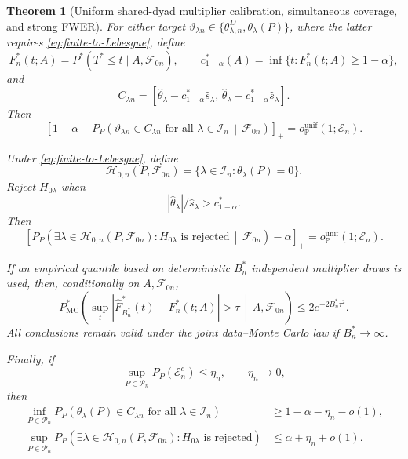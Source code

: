 \documentclass[11pt]{article}
\newtheorem{theorem}{Theorem}[section]
\theoremstyle{definition}
\newcommand{\1}{\mathbf 1}\newcommand{\op}{\operatorname}
\begin{document}
\begin{theorem}[Uniform shared-dyad multiplier calibration,\label{thm:fwer}
simultaneous coverage, and strong FWER]
For either target
$\vartheta_{\lambda n}\in\{\theta_{\lambda,n}^D,\theta_\lambda(P)\}$,
where the latter requires \eqref{eq:finite-to-Lebesgue}, define
\[
F_n^*(t;A)
=
P^*(T^*\le t\mid A,\mathcal F_{0n}),
\qquad
c_{1-\alpha}^*(A)
=
\inf\{t:F_n^*(t;A)\ge1-\alpha\},
\]
and
\[
C_{\lambda n}
=
\left[
\widehat\theta_\lambda-c_{1-\alpha}^*\widehat s_\lambda,\,
\widehat\theta_\lambda+c_{1-\alpha}^*\widehat s_\lambda
\right].
\]
Then
\begin{equation}
\left[
1-\alpha
-
P_P\!\left(
\vartheta_{\lambda n}\in C_{\lambda n}
\text{ for all }\lambda\in\mathcal I_n
\,\middle|\,
\mathcal F_{0n}
\right)
\right]_+
=
o_{\mathbb P}^{\mathrm{unif}}(1;\mathcal E_n).
\label{eq:conditional-coverage}
\end{equation}

Under \eqref{eq:finite-to-Lebesgue}, define
\[
\mathcal H_{0,n}(P,\mathcal F_{0n})
=
\{\lambda\in\mathcal I_n:\theta_\lambda(P)=0\}.
\]
Reject $H_{0\lambda}$ when
\[
|\widehat\theta_\lambda|/\widehat s_\lambda>c_{1-\alpha}^*.
\]
Then
\begin{equation}
\left[
P_P\!\left(
\exists\lambda\in\mathcal H_{0,n}(P,\mathcal F_{0n}):
H_{0\lambda}\text{ is rejected}
\,\middle|\,
\mathcal F_{0n}
\right)
-\alpha
\right]_+
=
o_{\mathbb P}^{\mathrm{unif}}(1;\mathcal E_n).
\label{eq:conditional-strong-fwer}
\end{equation}

If an empirical quantile based on deterministic $B_n^*$ independent
multiplier draws is used, then, conditionally on $A,\mathcal F_{0n}$,
\begin{equation}
P_{\mathrm{MC}}^*\!\left(
\sup_t|\widehat F_{B_n^*}^*(t)-F_n^*(t;A)|>\tau
\,\middle|\,
A,\mathcal F_{0n}
\right)
\le2e^{-2B_n^*\tau^2}.
\label{eq:conditional-DKW}
\end{equation}
All conclusions remain valid under the joint data--Monte Carlo law if
$B_n^*\to\infty$.

Finally, if
\[
\sup_{P\in\mathcal P_n}P_P(\mathcal E_n^c)
\le\eta_n,
\qquad
\eta_n\to0,
\]
then
\begin{align}
\inf_{P\in\mathcal P_n}
P_P\!\left(
\theta_\lambda(P)\in C_{\lambda n}
\text{ for all }\lambda\in\mathcal I_n
\right)
&\ge1-\alpha-\eta_n-o(1),
\label{eq:unconditional-coverage}\\
\sup_{P\in\mathcal P_n}
P_P\!\left(
\exists\lambda\in\mathcal H_{0,n}(P,\mathcal F_{0n}):
H_{0\lambda}\text{ is rejected}
\right)
&\le\alpha+\eta_n+o(1).
\label{eq:unconditional-strong-fwer}
\end{align}
\end{theorem}
\end{document}
